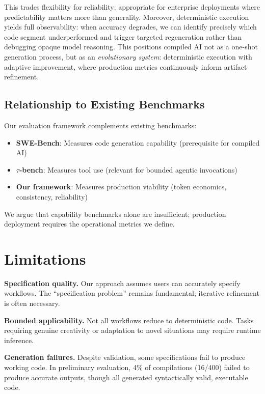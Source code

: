 \documentclass[11pt]{article}
\begin{document}
This trades flexibility for reliability: appropriate for enterprise deployments where predictability matters more than generality. Moreover, deterministic execution yields full observability: when accuracy degrades, we can identify precisely which code segment underperformed and trigger targeted regeneration rather than debugging opaque model reasoning. This positions compiled AI not as a one-shot generation process, but as an \emph{evolutionary system}: deterministic execution with adaptive improvement, where production metrics continuously inform artifact refinement.

\subsection{Relationship to Existing Benchmarks}

Our evaluation framework complements existing benchmarks:
\begin{itemize}
    \item \textbf{SWE-Bench}: Measures code generation capability (prerequisite for compiled AI)
    \item \textbf{$\tau$-bench}: Measures tool use (relevant for bounded agentic invocations)
    \item \textbf{Our framework}: Measures production viability (token economics, consistency, reliability)
\end{itemize}

We argue that capability benchmarks alone are insufficient; production deployment requires the operational metrics we define.

\section{Limitations}
\label{sec:limitations}

\textbf{Specification quality.} Our approach assumes users can accurately specify workflows. The ``specification problem'' remains fundamental; iterative refinement is often necessary.

\textbf{Bounded applicability.} Not all workflows reduce to deterministic code. Tasks requiring genuine creativity or adaptation to novel situations may require runtime inference.

\textbf{Generation failures.} Despite validation, some specifications fail to produce working code. In preliminary evaluation, 4\% of compilations (16/400) failed to produce accurate outputs, though all generated syntactically valid, executable code.
\end{document}
